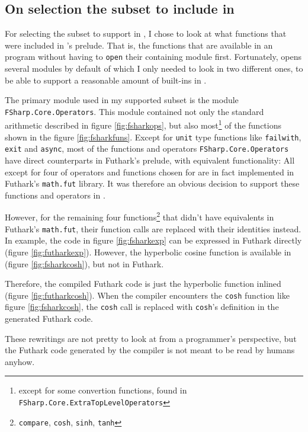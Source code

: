 \subsection{On selection the \fsharp{} subset to include in \fshark{}}
For selecting the \fsharp{} subset to support in \fshark{}, I chose to look at
what functions that were included in \fsharp{}'s prelude. That is, the
functions that are available in an \fsharp{} program without having to
\texttt{open} their containing module first.
Fortunately, \fsharp{} opens several modules by default of which I only
needed to look in two different ones, to be able to support a reasonable amount
of \fsharp{} built-ins in \fshark{}.

The primary module used in my supported \fsharp{} subset is the module
\texttt{FSharp.Core.Operators}.
This module contained not only the standard arithmetic described in figure
\ref{fig:fsharkops}, but also most\footnote{except for some convertion
  functions, found in \texttt{FSharp.Core.ExtraTopLevelOperators}} of the functions shown in the figure \ref{fig:fsharkfuns}.
Except for \texttt{unit} type functions like \texttt{failwith}, \texttt{exit}
and \texttt{async}, most of the functions and operators
\texttt{FSharp.Core.Operators} have direct counterparts in Futhark's prelude,
with equivalent functionality: All except for four of operators and functions chosen for
\fshark{} are in fact implemented in Futhark's \texttt{math.fut} library.
It was therefore an obvious decision to support these functions and operators in
\fshark{}.

However, for the remaining four functions\footnote{\texttt{compare}, \texttt{cosh}, \texttt{sinh}, \texttt{tanh}} that didn't have equivalents in
Futhark's \texttt{math.fut}, their function calls are replaced with their
identities instead.
In example, the \fshark{} code in figure \ref{fig:fsharkexp} can be
expressed in Futhark directly (figure \ref{fig:futharkexp}).
However, the hyperbolic cosine function is available in \fsharp{} (figure
\ref{fig:fsharkcosh}), but not in Futhark.

Therefore, the compiled \fshark{} Futhark code is just the hyperbolic function
inlined (figure \ref{fig:futharkcosh}).
When the \fshark{} compiler encounters the \texttt{cosh} function like figure \ref{fig:fsharkcosh}, the \texttt{cosh} call is replaced with
  \texttt{cosh}'s definition in the \fshark{} generated Futhark code. 

These rewritings are not pretty to look at from a programmer's perspective, but
the Futhark code generated by the \fshark{} compiler is not meant to be read by humans anyhow.

